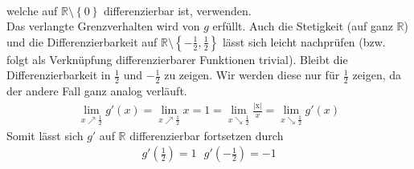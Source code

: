 \documentclass{scrreprt}
\newcommand{\RR}{\mathbb{R}}
\newcommand{\curly}[1]{\left\lbrace#1\right\rbrace}
\newcommand{\abs}[1]{\left\vert#1\right\vert}
\begin{document}
\begin{enumerate}[(a)]
\begin{align*}
    \end{align*}
    welche auf $\RR\setminus\curly{0}$ differenzierbar ist, verwenden.\\
    Das verlangte Grenzverhalten wird von $g$ erfüllt. Auch die Stetigkeit (auf ganz $\RR$) und die Differenzierbarkeit auf $\RR\setminus \curly{-\frac{1}{2}, \frac{1}{2}}$ lässt sich leicht nachprüfen (bzw. folgt als Verknüpfung differenzierbarer Funktionen trivial). Bleibt die Differenzierbarkeit in $\frac{1}{2}$ und $-\frac{1}{2}$ zu zeigen. Wir werden diese nur für $\frac{1}{2}$ zeigen, da der andere Fall ganz analog verläuft.
    \begin{align*}
        \lim\limits_{x \nearrow \frac{1}{2}} g'(x) = \lim\limits_{x \nearrow \frac{1}{2}} x = 1 = \lim\limits_{x \searrow \frac{1}{2}} \frac{\mathrm{\abs{x}}}{x} = \lim\limits_{x \searrow \frac{1}{2}} g'(x)
    \end{align*}
    Somit lässt sich $g'$ auf $\RR$ differenzierbar fortsetzen durch 
    \begin{align*}
        g'(\frac{1}{2}) = 1 ~~~ g'(-\frac{1}{2}) = -1
    \end{align*}

\end{enumerate}
\end{document}
